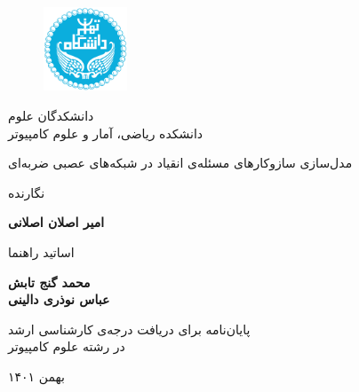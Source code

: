 \documentclass[12pt]{report}
\begin{document}
	
	
	\begin{figure}
		\centering
		\includegraphics[height=2.5cm]{ut.png}
	\end{figure}
	
	\begin{center}
		دانشکدگان علوم
		\\
		دانشکده ریاضی، آمار و علوم کامپیوتر
	\end{center}
	
	\begin{center}
	\end{center}
	
	\begin{center}
		\huge{مدل‌سازی سازوکارهای مسئله‌ی انقیاد در شبکه‌های عصبی ضربه‌ای}
	\end{center}
	
	\begin{center}
	\end{center}
	
	\begin{center}
		نگارنده
	\end{center}
	\begin{center}
		\textbf{
			امیر اصلان اصلانی
			\\[30pt]
		}
	\end{center}
	
	\begin{center}
		اساتید راهنما
	\end{center}
	\begin{center}
		\textbf{
			محمد گنج‌ تابش 
			\\[5pt]
			عباس نوذری دالینی
		}
	\end{center}
	
	\vspace{3cm}
	\begin{center}
		پایان‌نامه برای دریافت درجه‌ی کارشناسی ارشد
		\\
		در رشته علوم کامپیوتر
	\end{center}
	
	\begin{center}
		بهمن ۱۴۰۱
	\end{center}
	
\end{document}
